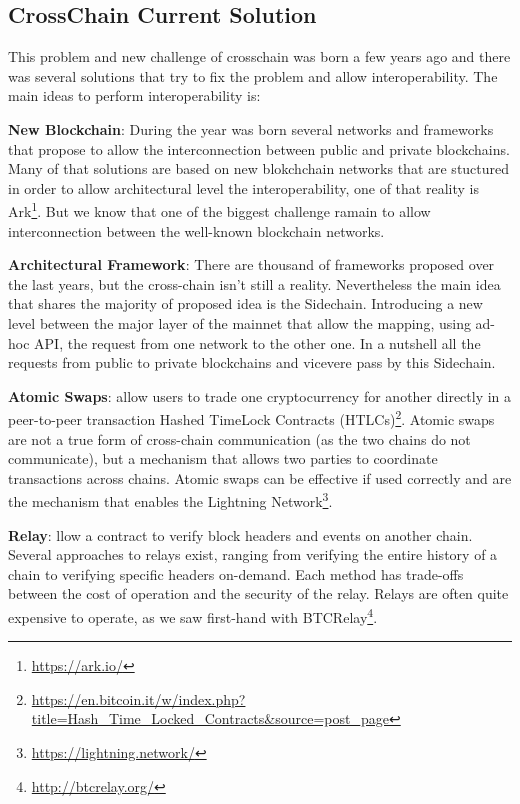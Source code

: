 \subsection{CrossChain Current Solution}

This problem and new challenge of crosschain was born a few years ago and there was several solutions
that try to fix the problem and allow interoperability. The main ideas to perform interoperability is:

\begin{outline}
    \1 \textbf{New Blockchain}: During the year was born several networks and frameworks that propose
    to allow the interconnection between public and private blockchains. Many of that solutions
    are based on new blokchchain networks that are stuctured in order to allow architectural level
    the interoperability, one of that reality is Ark\footnote{\url{https://ark.io/}}. 
    But we know that one of the biggest challenge ramain to allow interconnection between the well-known 
    blockchain networks. 

    \1 \textbf{Architectural Framework}: There are thousand of frameworks proposed over the last years,
    but the cross-chain isn't still a reality. Nevertheless the main idea that shares the majority
    of proposed idea is the Sidechain. Introducing a new level between the major layer of the mainnet 
    that allow the mapping, using ad-hoc API, the request from one network to the other one. In a nutshell
    all the requests from public to private blockchains and vicevere pass by this Sidechain. 

    \1 \textbf{Atomic Swaps}: allow users to trade one cryptocurrency for another directly in a peer-to-peer 
    transaction Hashed TimeLock Contracts (HTLCs)\footnote{\url{https://en.bitcoin.it/w/index.php?title=Hash_Time_Locked_Contracts&source=post_page}}. Atomic swaps are not a true form of cross-chain 
    communication (as the two chains do not communicate), but a mechanism that allows two parties to 
    coordinate transactions across chains. Atomic swaps can be effective if used correctly and are the 
    mechanism that enables the Lightning Network\footnote{\url{https://lightning.network/}}.

    \1 \textbf{Relay}: llow a contract to verify block headers and events on another chain. Several 
    approaches to relays exist, ranging from verifying the entire history of a chain to verifying specific 
    headers on-demand. Each method has trade-offs between the cost of operation and the security of the relay. 
    Relays are often quite expensive to operate, as we saw first-hand with BTCRelay\footnote{\url{http://btcrelay.org/}}.


\end{outline}
